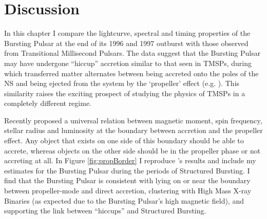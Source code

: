 \section{Discussion}

\par In this chapter I compare the lightcurve, spectral and timing properties of the Bursting Pulsar at the end of its 1996 and 1997 outburst with those observed from Transitional Millisecond Pulsars. The data suggest that the Bursting Pulsar may have undergone ``hiccup'' accretion similar to that seen in TMSPs, during which transferred matter alternates between being accreted onto the poles of the NS and being ejected from the system by the `propeller' effect (e.g. \citealp{Ferrigno_TMSPVar}). This similarity raises the exciting prospect of studying the physics of TMSPs in a completely different regime.
\par Recently \citealp{Campana_PropBorder} proposed a universal relation between magnetic moment, spin frequency, stellar radius and luminosity at the boundary between accretion and the propeller effect. Any object that exists on one side of this boundary should be able to accrete, whereas objects on the other side should be in the propeller phase or not accreting at all. In Figure \ref{fig:propBorder} I reproduce \citealp{Campana_PropBorder}'s results and include my estimates for the Bursting Pulsar during the periods of Structured Bursting. I find that the Bursting Pulsar is consistent with lying on or near the boundary between propeller-mode and direct accretion, clustering with High Mass X-ray Binaries (as expected due to the Bursting Pulsar's high magnetic field), and supporting the link between ``hiccups'' and Structured Bursting.

